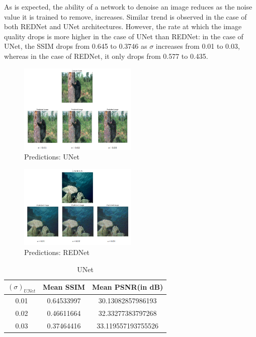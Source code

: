 \documentclass[journal]{IEEEtran} %
\begin{document}
As is expected, the ability of a network to denoise an image reduces as the noise value it is trained to remove, increases. Similar trend is observed in the case of both REDNet and UNet architectures. However, the rate at which the image quality drops is more higher in the case of UNet than REDNet: in the case of UNet, the SSIM drops from 0.645 to 0.3746 as $\sigma$ increases from 0.01 to 0.03, whereas in the case of REDNet, it only drops from 0.577 to 0.435.
\begin{figure}[htbp]
    \centering
    \includegraphics[width=0.5\textwidth]{Unet_pred_var_noise.png}
    \caption{Predictions: UNet}
    \label{fig:architecture}
\end{figure}

\begin{figure}[htbp]
    \centering
    \includegraphics[width=0.5\textwidth]{REDNet_pred_var_noise.png}
    \caption{Predictions: REDNet}
    \label{fig:architecture}
\end{figure}


\begin{table}[h!]
\centering
\begin{tabular}{||c c c||} 
 \hline
 $(\sigma)_{UNet}$ & Mean SSIM & Mean PSNR(in dB)\\ [0.5ex] 
 \hline\hline
 0.01 & 0.64533997 & 30.13082857986193 \\ 
 \hline
 0.02 & 0.46611664 & 32.33277383797268\\
 \hline
 0.03 & 0.37464416 & 33.119557193755526 \\
 \hline
\end{tabular}
\caption{UNet}
\label{table:1}
\end{table}
\end{document}
